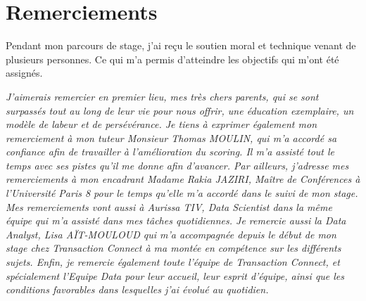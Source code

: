 
\chapter*{Remerciements}
Pendant mon parcours de stage, j'ai reçu le soutien moral et technique venant de plusieurs personnes. Ce qui m'a permis d'atteindre les objectifs qui m'ont été assignés.

\textit{J’aimerais remercier en premier lieu, mes très chers parents, qui se sont surpassés tout au
long de leur vie pour nous offrir, une éducation exemplaire, un modèle de
labeur et de persévérance.
\newline
\newline
Je tiens à exprimer également mon remerciement à mon tuteur Monsieur Thomas MOULIN, qui m'a accordé sa confiance afin de travailler à l'amélioration du scoring. Il m'a assisté tout le temps avec ses pistes qu'il me donne afin d'avancer.
\newline
\newline
Par ailleurs, j'adresse mes remerciements à mon encadrant Madame Rakia JAZIRI, Maître de Conférences à l'Université Paris 8 pour le temps qu'elle m'a accordé dans le suivi de mon stage.
\newline
\newline
Mes remerciements vont aussi à Aurissa TIV, Data Scientist dans la même équipe qui m’a assisté dans mes tâches quotidiennes. Je remercie aussi la Data Analyst, Lisa AÏT-MOULOUD qui m'a accompagnée depuis le début de mon stage chez Transaction Connect à ma montée en compétence sur les différents sujets.
\newline
\newline
Enfin, je remercie également toute l'équipe de Transaction Connect, et spécialement l’Equipe Data pour
leur accueil, leur esprit d'équipe, ainsi que les conditions favorables dans lesquelles j’ai évolué au quotidien.}




